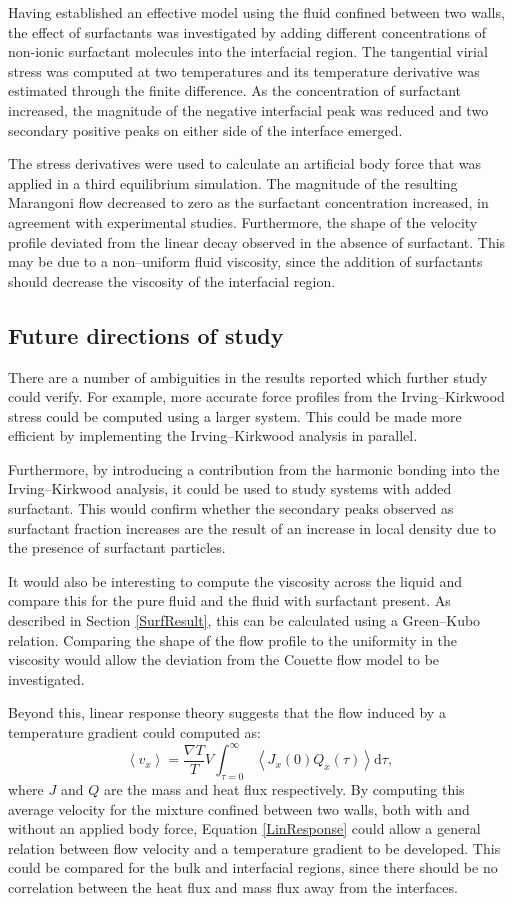 Having established an effective model using the fluid confined between two walls, the effect of surfactants was investigated by adding different concentrations of non-ionic surfactant molecules into the interfacial region.
The tangential virial stress was computed at two temperatures and its temperature derivative was estimated through the finite difference.
As the concentration of surfactant increased, the magnitude of the negative interfacial peak was reduced and two secondary positive peaks on either side of the interface emerged.

The stress derivatives were used to calculate an artificial body force that was applied in a third equilibrium simulation.
The magnitude of the resulting Marangoni flow decreased to zero as the surfactant concentration increased, in agreement with experimental studies.
Furthermore, the shape of the velocity profile deviated from the linear decay observed in the absence of surfactant.
This may be due to a non--uniform fluid viscosity, since the addition of surfactants should decrease the viscosity of the interfacial region.

\subsection{Future directions of study}
There are a number of ambiguities in the results reported which further study could verify. 
For example, more accurate force profiles from the Irving--Kirkwood stress could be computed using a larger system.
This could be made more efficient by implementing the Irving--Kirkwood analysis in parallel.

Furthermore, by introducing a contribution from the harmonic bonding into the Irving--Kirkwood analysis, it could be used to study systems with added surfactant.
This would confirm whether the secondary peaks observed as surfactant fraction increases are the result of an increase in local density due to the presence of surfactant particles.

It would also be interesting to compute the viscosity across the liquid and compare this for the pure fluid and the fluid with surfactant present.
As described in Section \ref{SurfResult}, this can be calculated using a Green--Kubo relation.
Comparing the shape of the flow profile to the uniformity in the viscosity would allow the deviation from the Couette flow model to be investigated.

Beyond this, linear response theory suggests that the flow induced by a temperature gradient could computed as:
\begin{equation}
\left< v_{x} \right> = \frac{\nabla T}{T} V \int_{\tau =0}^{\infty} \left< J_{x}(0) Q_{x}(\tau) \right> \mathrm{d} \tau,
\label{LinResponse}
\end{equation}
where $J$ and $Q$ are the mass and heat flux respectively.
By computing this average velocity for the mixture confined between two walls, both with and without an applied body force, Equation \ref{LinResponse} could allow a general relation between flow velocity and a temperature gradient to be developed.
This could be compared for the bulk and interfacial regions, since there should be no correlation between the heat flux and mass flux away from the interfaces.


